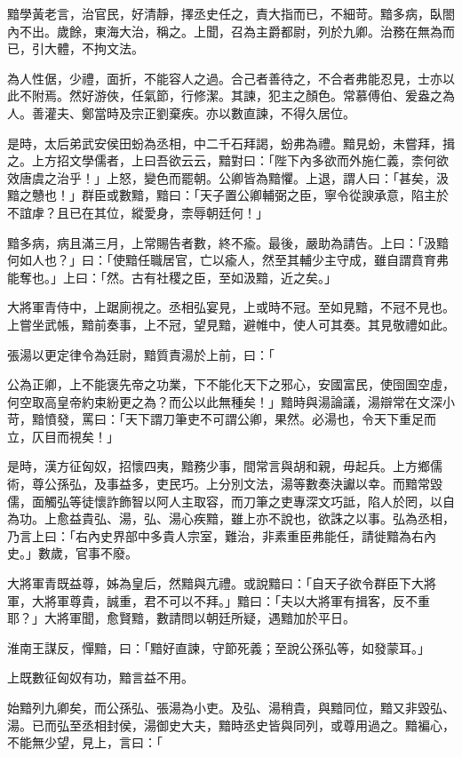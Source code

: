 \begin{pinyinscope}
黯學黃老言，治官民，好清靜，擇丞史任之，責大指而已，不細苛。黯多病，臥閤內不出。歲餘，東海大治，稱之。上聞，召為主爵都尉，列於九卿。治務在無為而已，引大體，不拘文法。

為人性倨，少禮，面折，不能容人之過。合己者善待之，不合者弗能忍見，士亦以此不附焉。然好游俠，任氣節，行修潔。其諫，犯主之顏色。常慕傅伯、爰盎之為人。善灌夫、鄭當時及宗正劉棄疾。亦以數直諫，不得久居位。

是時，太后弟武安侯田蚡為丞相，中二千石拜謁，蚡弗為禮。黯見蚡，未嘗拜，揖之。上方招文學儒者，上曰吾欲云云，黯對曰：「陛下內多欲而外施仁義，柰何欲效唐虞之治乎！」上怒，變色而罷朝。公卿皆為黯懼。上退，謂人曰：「甚矣，汲黯之戇也！」群臣或數黯，黯曰：「天子置公卿輔弼之臣，寧令從諛承意，陷主於不誼虖？且已在其位，縱愛身，柰辱朝廷何！」

黯多病，病且滿三月，上常賜告者數，終不瘉。最後，嚴助為請告。上曰：「汲黯何如人也？」曰：「使黯任職居官，亡以瘉人，然至其輔少主守成，雖自謂賁育弗能奪也。」上曰：「然。古有社稷之臣，至如汲黯，近之矣。」

大將軍青侍中，上踞廁視之。丞相弘宴見，上或時不冠。至如見黯，不冠不見也。上嘗坐武帳，黯前奏事，上不冠，望見黯，避帷中，使人可其奏。其見敬禮如此。

張湯以更定律令為廷尉，黯質責湯於上前，曰：「

公為正卿，上不能褒先帝之功業，下不能化天下之邪心，安國富民，使囹圄空虛，何空取高皇帝約束紛更之為？而公以此無種矣！」黯時與湯論議，湯辯常在文深小苛，黯憤發，罵曰：「天下謂刀筆吏不可謂公卿，果然。必湯也，令天下重足而立，仄目而視矣！」

是時，漢方征匈奴，招懷四夷，黯務少事，間常言與胡和親，毋起兵。上方鄉儒術，尊公孫弘，及事益多，吏民巧。上分別文法，湯等數奏決讞以幸。而黯常毀儒，面觸弘等徒懷詐飾智以阿人主取容，而刀筆之吏專深文巧詆，陷人於罔，以自為功。上愈益貴弘、湯，弘、湯心疾黯，雖上亦不說也，欲誅之以事。弘為丞相，乃言上曰：「右內史界部中多貴人宗室，難治，非素重臣弗能任，請徙黯為右內史。」數歲，官事不廢。

大將軍青既益尊，姊為皇后，然黯與亢禮。或說黯曰：「自天子欲令群臣下大將軍，大將軍尊貴，誠重，君不可以不拜。」黯曰：「夫以大將軍有揖客，反不重耶？」大將軍聞，愈賢黯，數請問以朝廷所疑，遇黯加於平日。

淮南王謀反，憚黯，曰：「黯好直諫，守節死義；至說公孫弘等，如發蒙耳。」

上既數征匈奴有功，黯言益不用。

始黯列九卿矣，而公孫弘、張湯為小吏。及弘、湯稍貴，與黯同位，黯又非毀弘、湯。已而弘至丞相封侯，湯御史大夫，黯時丞史皆與同列，或尊用過之。黯褊心，不能無少望，見上，言曰：「


\end{pinyinscope}
